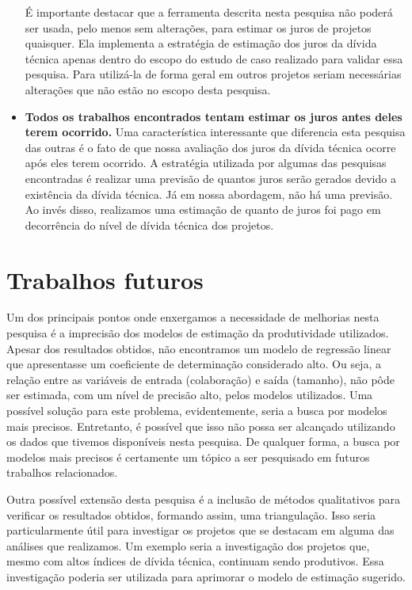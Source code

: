 \begin{itemize}
É importante destacar que a ferramenta descrita nesta pesquisa não poderá ser usada, pelo menos sem alterações, para estimar os juros de projetos quaisquer. Ela implementa a estratégia de estimação dos juros da dívida técnica apenas dentro do escopo do estudo de caso realizado para validar essa pesquisa. Para utilizá-la de forma geral em outros projetos seriam necessárias alterações que não estão no escopo desta pesquisa. 

\item \textbf{Todos os trabalhos encontrados tentam estimar os juros antes deles terem ocorrido.} Uma característica interessante que diferencia esta pesquisa das outras é o fato de que nossa avaliação dos juros da dívida técnica ocorre após eles terem ocorrido. A estratégia utilizada por algumas das pesquisas encontradas é realizar uma previsão de quantos juros serão gerados devido a existência da dívida técnica. Já em nossa abordagem, não há uma previsão. Ao invés disso, realizamos uma estimação de quanto de juros foi pago em decorrência do nível de dívida técnica dos projetos. 

\end{itemize}

\section{Trabalhos futuros}

Um dos principais pontos onde enxergamos a necessidade de melhorias nesta pesquisa é a imprecisão dos modelos de estimação da produtividade utilizados. Apesar dos resultados obtidos, não encontramos um modelo de regressão linear que apresentasse um coeficiente de determinação considerado alto. Ou seja, a relação entre as variáveis de entrada (colaboração) e saída (tamanho), não pôde ser estimada, com um nível de precisão alto, pelos modelos utilizados. Uma possível solução  para este problema, evidentemente, seria a busca por modelos mais precisos. Entretanto, é possível que isso não possa ser alcançado utilizando os dados que tivemos disponíveis nesta pesquisa. De qualquer forma, a busca por modelos mais precisos é certamente um tópico a ser pesquisado em futuros trabalhos relacionados.

Outra possível extensão desta pesquisa é a inclusão de métodos qualitativos para verificar os resultados obtidos, formando assim, uma triangulação\cite{fielding2012triangulation}. Isso seria particularmente útil para investigar os projetos que se destacam em alguma das análises que realizamos. Um exemplo seria a investigação dos projetos que, mesmo com altos índices de dívida técnica, continuam sendo produtivos. Essa investigação poderia ser utilizada para aprimorar o modelo de estimação sugerido. 

